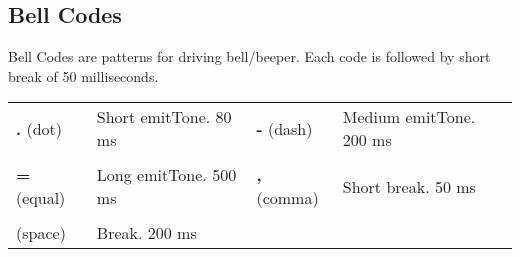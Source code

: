 \subsection{Bell Codes}

Bell Codes are patterns for driving bell/beeper. Each code is followed by short break of 50 milliseconds.

\begin{tabularx}{\textwidth}{l X l X}
	\textbf{.} (dot) & Short emitTone. 80 ms & \textbf{-} (dash) & Medium emitTone. 200 ms
	\\ \\
	\textbf{=} (equal) & Long emitTone. 500 ms & \textbf{,} (comma) & Short break. 50 ms
	\\ \\
	(space) & Break. 200 ms
\end{tabularx}